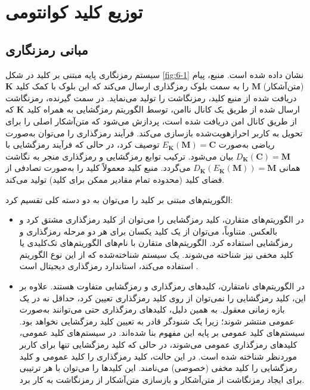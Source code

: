 
\chapter{توزیع کلید کوانتومی}\label{chap:6}



\section{مبانی رمزنگاری}
\label{sec:6-1}


سیستم رمزنگاری پایه مبتنی بر کلید در شکل \ref{fig:6-1} نشان داده شده است. منبع، پیام (متن‌آشکار) $\bm{M}$ را به سمت بلوک رمزگذاری ارسال می‌کند که این بلوک با کمک کلید $\bm{K}$ دریافت شده از منبع کلید، رمزنگاشت را تولید می‌نماید. در سمت گیرنده، رمزنگاشت ارسال شده از طریق یک کانال ناامن، توسط الگوریتم رمزگشایی به همراه کلید $\bm{K}$ که از طریق کانال امن دریافت شده است، پردازش می‌شود که متن‌آشکار اصلی را برای تحویل به کاربر احرازهویت‌شده بازسازی می‌کند. فرآیند رمزگذاری را می‌توان به‌صورت ریاضی به‌صورت $E_{\bm{K}}(\bm{M}) = \bm{C}$ توصیف کرد، در حالی که فرآیند رمزگشایی با $D_{\bm{K}}(\bm{C}) = \bm{M}$ بیان می‌شود. ترکیب توابع رمزگشایی و رمزگذاری منجر به نگاشت همانی $D_{\bm{K}}(E_{\bm{K}}(\bm{M})) = \bm{M}$ می‌گردد. منبع کلید معمولاً کلید را به‌صورت تصادفی از فضای کلید (محدوده تمام مقادیر ممکن برای کلید) تولید می‌کند.

الگوریتم‌های مبتنی بر کلید را می‌توان به دو دسته کلی تقسیم کرد:
\begin{itemize}
	\item در الگوریتم‌های متقارن، کلید رمزگشایی را می‌توان از کلید رمزگذاری مشتق کرد و بالعکس. متناوباً، می‌توان از یک کلید یکسان برای هر دو مرحله رمزگذاری و رمزگشایی استفاده کرد. الگوریتم‌های متقارن با نام‌های الگوریتم‌های تک‌کلیدی یا کلید مخفی نیز شناخته می‌شوند. یک سیستم شناخته‌شده که از این نوع الگوریتم استفاده می‌کند، استاندارد رمزگذاری دیجیتال است \cite{1,2,3,4}.
	\item در الگوریتم‌های نامتقارن، کلیدهای رمزگذاری و رمزگشایی متفاوت هستند. علاوه بر این، کلید رمزگشایی را نمی‌توان از روی کلید رمزگذاری تعیین کرد، حداقل نه در یک بازه زمانی معقول. به همین دلیل، کلیدهای رمزگذاری حتی می‌توانند به‌صورت عمومی منتشر شوند؛ زیرا یک شنودگر قادر به تعیین کلید رمزگشایی نخواهد بود. سیستم‌های کلید عمومی \cite{5} بر پایه این مفهوم بنا شده‌اند. در سیستم‌های کلید عمومی، کلیدهای رمزگذاری عمومی می‌شوند، در حالی که کلید رمزگشایی تنها برای کاربر موردنظر شناخته شده است. در این حالت، کلید رمزگذاری را کلید عمومی و کلید رمزگشایی را کلید مخفی (خصوصی) می‌نامند. این کلیدها را می‌توان با هر ترتیبی برای ایجاد رمزنگاشت از متن‌آشکار و بازسازی متن‌آشکار از رمزنگاشت به کار برد.
\end{itemize}

